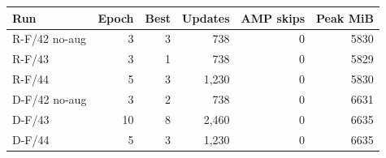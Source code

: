 \begin{tabular}{lrrrrr}
\toprule
Run & Epoch & Best & Updates & AMP skips & Peak MiB\\
\midrule
R-F/42 no-aug & 3 & 3 & 738 & 0 & 5830\\
R-F/43 & 3 & 1 & 738 & 0 & 5829\\
R-F/44 & 5 & 3 & 1,230 & 0 & 5830\\
D-F/42 no-aug & 3 & 2 & 738 & 0 & 6631\\
D-F/43 & 10 & 8 & 2,460 & 0 & 6635\\
D-F/44 & 5 & 3 & 1,230 & 0 & 6635\\
\bottomrule
\end{tabular}
